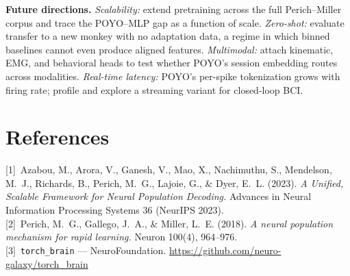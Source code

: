 \documentclass[11pt]{article}
\begin{document}
\textbf{Future directions.} \emph{Scalability:} extend pretraining across the full Perich--Miller corpus and trace the POYO--MLP gap as a function of scale. \emph{Zero-shot:} evaluate transfer to a new monkey with no adaptation data, a regime in which binned baselines cannot even produce aligned features. \emph{Multimodal:} attach kinematic, EMG, and behavioral heads to test whether POYO's session embedding routes across modalities. \emph{Real-time latency:} POYO's per-spike tokenization grows with firing rate; profile and explore a streaming variant for closed-loop BCI.

\section*{References}
\small
[1]~Azabou, M., Arora, V., Ganesh, V., Mao, X., Nachimuthu, S., Mendelson, M.~J., Richards, B., Perich, M.~G., Lajoie, G., \& Dyer, E.~L. (2023). \emph{A Unified, Scalable Framework for Neural Population Decoding.} Advances in Neural Information Processing Systems 36 (NeurIPS 2023). \\
{[2]}~Perich, M.~G., Gallego, J.~A., \& Miller, L.~E. (2018). \emph{A neural population mechanism for rapid learning.} Neuron 100(4), 964--976. \\
{[3]}~\texttt{torch\_brain} --- NeuroFoundation. \url{https://github.com/neuro-galaxy/torch_brain}
\end{document}
